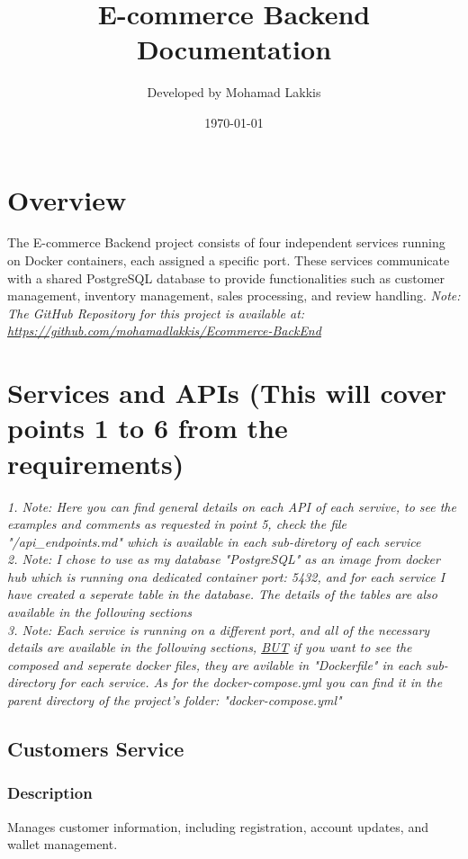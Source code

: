 \documentclass[a4paper,12pt]{article}
\title{E-commerce Backend Documentation}
\author{Developed by Mohamad Lakkis}
\date{\today}
\begin{document}
\maketitle

\tableofcontents
\newpage


\section{Overview}
The E-commerce Backend project consists of four independent services running on Docker containers, each assigned a specific port. These services communicate with a shared PostgreSQL database to provide functionalities such as customer management, inventory management, sales processing, and review handling.
\textit{Note: The GitHub Repository for this project is available at: \href{https://github.com/mohamadlakkis/Ecommerce-BackEnd}{https://github.com/mohamadlakkis/Ecommerce-BackEnd}}
\section{Services and APIs (This will cover points 1 to 6 from the requirements)}
\textit{1. Note: Here you can find general details on each API of each servive, to see the examples and comments as requested in point 5, check the file "/api\_endpoints.md" which is available in each sub-diretory of each service}\\
\textit{2. Note: I chose to use as my database "PostgreSQL" as an image from docker hub which is running ona dedicated container port: 5432, and for each service I have created a seperate table in the database. The details of the tables are also available in the following sections}\\
\textit{3. Note: Each service is running on a different port, and all of the necessary details are available in the following sections, \underline{BUT} if you want to see the composed and seperate docker files, they are avilable in "Dockerfile" in each sub-directory for each service. As for the docker-compose.yml you can find it in the parent directory of the project's folder: "docker-compose.yml"}

\subsection{Customers Service}
\subsubsection{Description}
Manages customer information, including registration, account updates, and wallet management.
\end{document}

